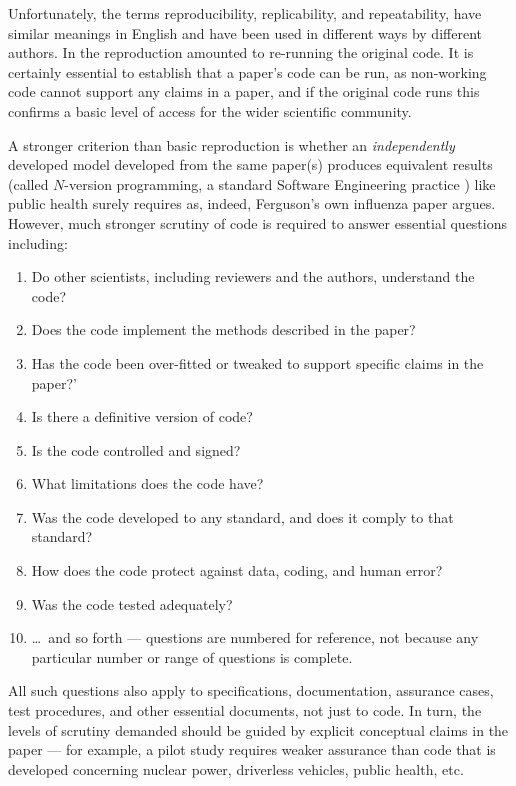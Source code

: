 \documentclass{comjnl}
\begin{document}
Unfortunately, the terms reproducibility, replicability, and repeatability, have similar meanings in English and have been used in different ways by different authors. In \cite{codecheck,thumbs-up} the reproduction amounted to re-running the original code. It is certainly essential to establish that a paper's code can be run, as non-working code cannot support any claims in a paper, and if the original code runs this confirms a basic level of access for the wider scientific community. 

A stronger criterion than basic reproduction is whether an \emph{independently\/} developed model developed from the same paper(s) produces equivalent results (called $N$-version programming, a standard Software Engineering practice \cite{NVP}) like public health surely requires as, indeed, Ferguson's own influenza paper \cite{nvp-ferguson} argues. However, much stronger scrutiny of code is required to answer essential questions including:

\newcount \enum
{}
\renewcommand{\theenumi}{\ifnum \enum<10 \hphantom{0}\fi
\the\enum
\global\advance \enum by 1}
\begin{enumerate}\raggedright
\item Do other scientists, including reviewers and the authors, understand the code?
\item Does the code implement the methods described in the paper?
\item Has the code been over-fitted or tweaked to support specific claims in the paper?'
\item Is there a definitive version of code?
\item Is the code controlled and signed?
\item What limitations does the code have?
\item Was the code developed to any standard, and does it comply to that standard?
\item How does the code protect against data, coding, and human error?
\item Was the code tested adequately?
\item \ldots\ and so forth --- questions are numbered for reference, not because any particular number or range of questions is complete. 
\end{enumerate}

All such questions also apply to specifications, documentation, assurance cases, test procedures, and other essential documents, not just to code. In turn, the levels of scrutiny demanded should be guided by explicit conceptual claims in the paper \cite{essence-of-software} --- for example, a pilot study requires weaker assurance than code that is developed concerning nuclear power, driverless vehicles, public health, etc. 
\end{document}
